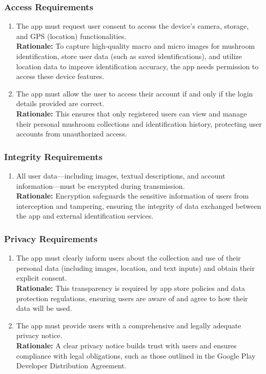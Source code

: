 \documentclass[]{article}
\begin{document}
\subsubsection{Access Requirements}
\label{ssub:access_requirements}
\begin{enumerate}[{SR-AC}1. ]
	\item The app must request user consent to access the device's camera, storage, and GPS (location) functionalities.\\
	\textbf{Rationale:} To capture high-quality macro and micro images for mushroom identification, store user data (such as saved identifications), and utilize location data to improve identification accuracy, the app needs permission to access these device features.
	\item The app must allow the user to access their account if and only if the login details provided are correct.\\
	\textbf{Rationale:} This ensures that only registered users can view and manage their personal mushroom collections and identification history, protecting user accounts from unauthorized access.
\end{enumerate}

\subsubsection{Integrity Requirements}
\label{ssub:integrity_requirements}
\begin{enumerate}[{SR-INT}1. ]
	\item All user data—including images, textual descriptions, and account information—must be encrypted during transmission.\\
	\textbf{Rationale:} Encryption safeguards the sensitive information of users from interception and tampering, ensuring the integrity of data exchanged between the app and external identification services.
\end{enumerate}

\subsubsection{Privacy Requirements}
\label{ssub:privacy_requirements}
\begin{enumerate}[{SR-P}1. ]
	\item The app must clearly inform users about the collection and use of their personal data (including images, location, and text inputs) and obtain their explicit consent.\\
	\textbf{Rationale:} This transparency is required by app store policies and data protection regulations, ensuring users are aware of and agree to how their data will be used.
	\item The app must provide users with a comprehensive and legally adequate privacy notice.\\
	\textbf{Rationale:} A clear privacy notice builds trust with users and ensures compliance with legal obligations, such as those outlined in the Google Play Developer Distribution Agreement.
\end{enumerate}
\end{document}

